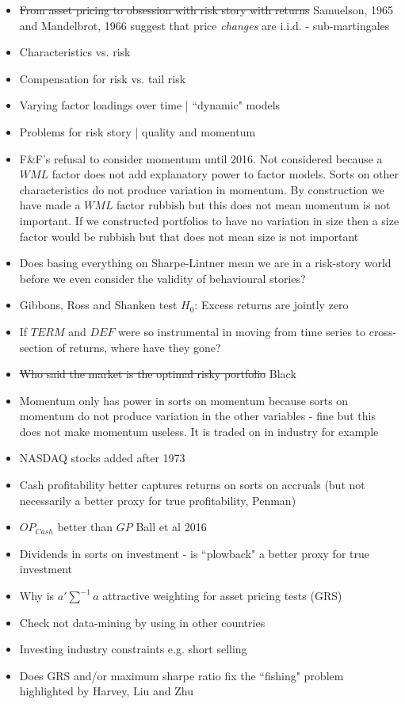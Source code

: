 \begin{itemize}
  \item \sout{From asset pricing to obsession with risk story with returns}
  Samuelson, 1965 and Mandelbrot, 1966 suggest that price \emph{changes} are i.i.d. -
  sub-martingales
  \item Characteristics vs. risk
  \item Compensation for risk vs. tail risk
  \item Varying factor loadings over time | ``dynamic" models
  \item Problems for risk story | quality and momentum
  \item F\&F's refusal to consider momentum until 2016. Not considered because a $WML$ 
  factor does not add explanatory power to factor models. Sorts on other characteristics
  do not produce variation in momentum. By construction we have made a $WML$ factor
  rubbish but this does not mean momentum is not important. If we constructed portfolios
  to have no variation in size then a size factor would be rubbish but that does not mean
  size is not important
  \item Does basing everything on Sharpe-Lintner mean we are in a risk-story world before
  we even consider the validity of behavioural stories?
  \item Gibbons, Ross and Shanken test $H_0$: Excess returns are jointly zero
  \item If $TERM$ and $DEF$ were so instrumental in moving from time series to
  cross-section of returns, where have they gone?
  \item \sout{Who said the market is the optimal risky portfolio} Black
  \item Momentum only has power in sorts on momentum because sorts on momentum do not
  produce variation in the other variables - fine but this does not make momentum useless.
  It is traded on in industry for example
  \item NASDAQ stocks added after 1973
  \item Cash profitability better captures returns on sorts on accruals (but not
  necessarily a better proxy for true profitability, Penman)
  \item $OP_{Cash}$ better than $GP$ Ball et al 2016
  \item Dividends in sorts on investment - is ``plowback" a better proxy for true
  investment
  \item Why is $a'\sum^{-1}a$ attractive weighting for asset pricing tests (GRS)
  \item Check not data-mining by using in other countries
  \item Investing industry constraints e.g. short selling
  \item Does GRS and/or maximum sharpe ratio fix the ``fishing" problem highlighted by
  Harvey, Liu and Zhu

\end{itemize}
